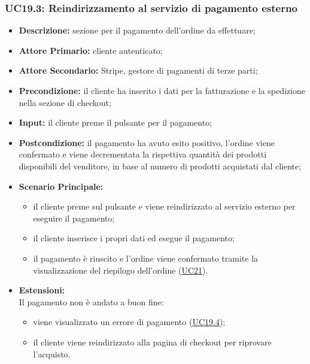 \subsubsection{UC19.3: Reindirizzamento al servizio di pagamento esterno}
\label{sec:UC19.3}
\begin{itemize}
    \item \textbf{Descrizione:} sezione per il pagamento dell'ordine da effettuare;
    \item \textbf{Attore Primario:} cliente autenticato;
    \item \textbf{Attore Secondario:} Stripe, gestore di pagamenti di terze parti;
    \item \textbf{Precondizione:} il cliente ha inserito i dati per la fatturazione e la spedizione nella sezione di checkout;
    \item \textbf{Input:} il cliente preme il pulsante per il pagamento;
    \item \textbf{Postcondizione:} il pagamento ha avuto esito positivo, l'ordine viene confermato e viene decrementata la rispettiva quantità dei prodotti disponibili del venditore, in base al numero di prodotti acquistati dal cliente;
    \item \textbf{Scenario Principale:}
          \begin{itemize}
              \item il cliente preme sul pulsante e viene reindirizzato al servizio esterno per eseguire il pagamento;
              \item il cliente inserisce i propri dati ed esegue il pagamento;
              \item il pagamento è riuscito e l'ordine viene confermato tramite la visualizzazione del riepilogo dell'ordine (\hyperref[sec:UC21]{\underline{UC21}}).
          \end{itemize}
    \item \textbf{Estensioni:}\\
          Il pagamento non è andato a buon fine:
          \begin{itemize}
              \item viene visualizzato un errore di pagamento (\hyperref[sec:UC19.4]{\underline{UC19.4}});
              \item il cliente viene reindirizzato alla pagina di checkout per riprovare l'acquisto.
          \end{itemize}
\end{itemize}
